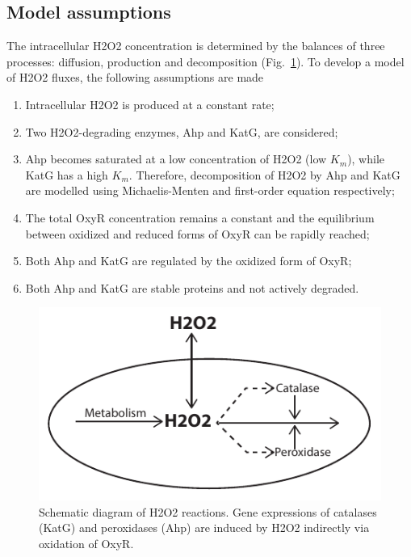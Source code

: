 \documentclass[10pt]{article}
\begin{document}
\subsection{Model assumptions}
The intracellular H2O2 concentration is determined by the balances of three processes: diffusion, production and decomposition (Fig.~\ref{fig:h2o2_decomposition_schematic_diagram}). To develop a model of H2O2 fluxes, the following assumptions are made
\begin{enumerate}
\item{Intracellular H2O2 is produced at a constant rate;}
\item{Two H2O2-degrading enzymes, Ahp and KatG, are considered;}
\item{Ahp becomes saturated at a low concentration of H2O2 (low $K_m$), while KatG has a high $K_m$. Therefore, decomposition of H2O2 by Ahp and KatG are modelled using Michaelis-Menten and first-order equation respectively;}
\item{The total OxyR concentration remains a constant and the equilibrium between oxidized and reduced forms of OxyR can be rapidly reached;}
\item{Both Ahp and KatG are regulated by the oxidized form of OxyR;}
\item{Both Ahp and KatG are stable proteins and not actively degraded.}
\end{enumerate}

\begin{figure}[h!]
\centering
  \includegraphics[width=0.5\linewidth]{h2o2_decomposition.pdf}
  \caption{Schematic diagram of H2O2 reactions. Gene expressions of catalases (KatG) and peroxidases (Ahp) are induced by H2O2 indirectly via oxidation of OxyR.}
  \label{fig:h2o2_decomposition_schematic_diagram}
\end{figure}

\end{document}
